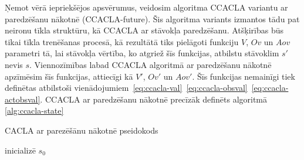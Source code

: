 \documentclass{ludis} %
\begin{document}
Ņemot vērā iepriekšējos apsvērumus, veidosim algoritma CCACLA variantu ar
paredzēšanu nākotnē (CCACLA-future). Šis algoritma variants izmantos tādu pat neironu tīkla
struktūru, kā CCACLA ar stāvokļa paredzēšanu. Atšķirības būs tikai tīkla
trenēšanas procesā, kā rezultātā tiks pielāgoti funkciju $V$, $Ov$ un $Aov$
parametri tā, lai stāvokļa vērtība, ko atgriež šīs funkcijas, atbilstu stāvoklim
$s'$ nevis $s$. Viennozīmības labad CCACLA algoritmā ar paredzēšanu nākotnē
apzīmēsim šīs funkcijas, attiecīgi kā $V'$, $Ov'$ un $Aov'$. Šīs funkcijas
nemainīgi tiek definētas atbilstoši
vienādojumiem~\eqref{eq:ccacla-val}~\eqref{eq:ccacla-obsval}~\eqref{eq:ccacla-actobsval}.
CCACLA ar paredzēšanu nākotnē precīzāk definēts algoritmā \ref{alg:ccacla-state}


\begin{spacing}{1}
\begin{algorithm}
\caption{CACLA ar parezēšānu nākotnē pseidokods}\label{alg:ccacla-future}
inicializē $s_0$ \\
\end{algorithm}
\end{spacing}
\end{document}
